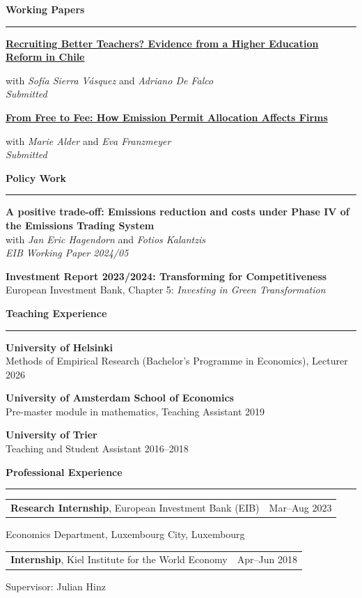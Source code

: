 \documentclass[10pt]{article}
\makeatletter
\newcommand{\cvsection}[1]{%
    \vspace{0.95em}
    {\large\bfseries #1}\par
    \vspace{0.10em}
    \hrule
    \vspace{0.55em}
}
\newcommand{\datedentry}[3]{%
    \begin{tabularx}{\textwidth}{@{}X>{\raggedleft\arraybackslash}p{3.1cm}@{}}
        #1 & #2
    \end{tabularx}
    #3
}
\newcommand{\paper}[3]{%
    \textbf{\href{#2}{#1}}\par
    #3
}
\makeatother
\begin{document}
\cvsection{Working Papers}

\paper
{Recruiting Better Teachers? Evidence from a Higher Education Reform in Chile}
{https://papers.ssrn.com/sol3/papers.cfm?abstract_id=4874361}
{with \textit{Sofía Sierra Vásquez} and \textit{Adriano De Falco}\\
\textit{Submitted}}

\vspace{0.65em}
\paper
{From Free to Fee: How Emission Permit Allocation Affects Firms}
{https://papers.ssrn.com/sol3/papers.cfm?abstract_id=5521119}
{with \textit{Marie Alder} and \textit{Eva Franzmeyer}\\
\textit{Submitted}}

\cvsection{Policy Work}

\textbf{A positive trade-off: Emissions reduction and costs under Phase IV of the Emissions Trading System}\\
with \textit{Jan Eric Hagendorn} and \textit{Fotios Kalantzis}\\
\textit{EIB Working Paper 2024/05}

\vspace{0.65em}
\textbf{Investment Report 2023/2024: Transforming for Competitiveness}\\
European Investment Bank, Chapter 5: \textit{Investing in Green Transformation}



\cvsection{Teaching Experience}

\textbf{University of Helsinki}\\
Methods of Empirical Research (Bachelor's Programme in Economics), Lecturer \hfill 2026

\vspace{0.65em}
\textbf{University of Amsterdam School of Economics}\\
Pre-master module in mathematics, Teaching Assistant \hfill 2019

\vspace{0.65em}
\textbf{University of Trier}\\
Teaching and Student Assistant \hfill 2016--2018

\newpage

\cvsection{Professional Experience}

\datedentry{\textbf{Research Internship}, European Investment Bank (EIB)}{Mar--Aug 2023}{%
    Economics Department, Luxembourg City, Luxembourg
}

\vspace{0.55em}
\datedentry{\textbf{Internship}, Kiel Institute for the World Economy}{Apr--Jun 2018}{%
    Supervisor: Julian Hinz
}
\end{document}
